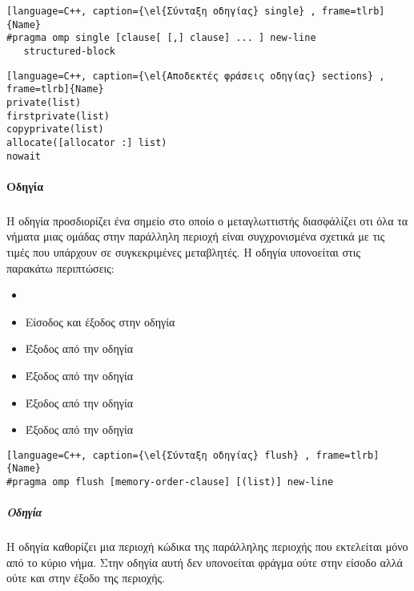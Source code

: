 \begin{lstlisting}[language=C++, caption={\el{Σύνταξη οδηγίας} single} , frame=tlrb]{Name} 
#pragma omp single [clause[ [,] clause] ... ] new-line 
   structured-block
\end{lstlisting}

\begin{lstlisting}[language=C++, caption={\el{Αποδεκτές φράσεις οδηγίας} sections} , frame=tlrb]{Name}
private(list) 
firstprivate(list) 
copyprivate(list) 
allocate([allocator :] list) 
nowait
\end{lstlisting}


\paragraph{Οδηγία \emph{}}
\subparagraph{}
Η οδηγία \emph{} προσδιορίζει ένα σημείο στο οποίο ο μεταγλωττιστής διασφάλίζει οτι όλα τα νήματα μιας ομάδας στην παράλληλη περιοχή είναι συγχρονισμένα σχετικά με τις τιμές που υπάρχουν σε συγκεκριμένες μεταβλητές.
Η οδηγία \emph{} υπονοείται στις παρακάτω περιπτώσεις\cite{ibm_flush}:
\begin{itemize}
\item{\emph{}}
\item{Είσοδος και έξοδος στην οδηγία \emph{}}
\item{Έξοδος από την οδηγία \emph{}}
\item{Έξοδος από την οδηγία \emph{}}
\item{Έξοδος από την οδηγία \emph{}}
\item{Έξοδος από την οδηγία \emph{}}
\end{itemize}

\begin{lstlisting}[language=C++, caption={\el{Σύνταξη οδηγίας} flush} , frame=tlrb]{Name} 
#pragma omp flush [memory-order-clause] [(list)] new-line

\end{lstlisting}


\subparagraph{Οδηγία \emph{}}
\subparagraph{}
Η οδηγία \emph{} καθορίζει μια περιοχή κώδικα της παράλληλης περιοχής που εκτελείται μόνο από το κύριο νήμα.
Στην οδηγία αυτή δεν υπονοείται φράγμα ούτε στην είσοδο αλλά ούτε και στην έξοδο της περιοχής\cite{ibm_master}.


